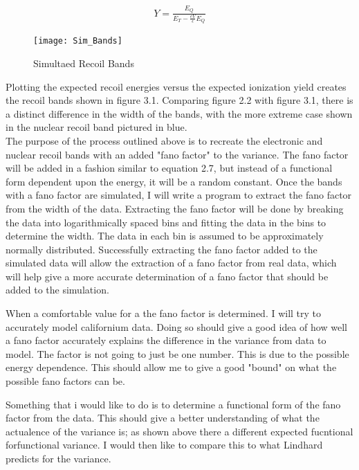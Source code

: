 \begin{equation}
\begin{gathered}
Y = \frac{E_Q}{E_T-\frac{eV}{\epsilon}E_Q}
\end{gathered}
\end{equation}



\begin{figure}[h]
	\centering
	\texttt{[image: Sim\_Bands]}
	\caption{Simultaed Recoil Bands}
\end{figure}
\noindent
Plotting the expected recoil energies versus the expected ionization yield creates the recoil bands shown in figure 3.1. Comparing figure 2.2 with figure 3.1, there is a distinct difference in the width of the bands, with the more extreme case shown in the nuclear recoil band pictured in blue. 
\\
The purpose of the process outlined above is to recreate the electronic and nuclear recoil bands with an added "fano factor" to the variance. The fano factor will be added in a fashion similar to equation 2.7, but instead of a functional form dependent upon the energy, it will be a random constant. Once the bands with a fano factor are simulated, I will write a program to extract the fano factor from the width of the data. Extracting the fano factor will be done by breaking the data into logarithmically spaced bins and fitting the data in the bins to determine the width. The data in each bin is assumed to be approximately normally distributed. Successfully extracting the fano factor added to the simulated data will allow the extraction of a fano factor from real data, which will help give a more accurate determination of a fano factor that should be added to the simulation. \par
\noindent
When a comfortable value for a the fano factor is determined. I will try to accurately model californium data. Doing so should give a good idea of how well a fano factor accurately explains the difference in the variance from data to model. The factor is not going to just be one number. This is due to the possible energy dependence. This should allow me to give a good "bound" on what the possible fano factors can be. \par
\noindent
Something that i would like to do is to determine a functional form of the fano factor from the data. This should give a better understanding of what the actualence of the variance is; as shown above there a different expected fucntional forfunctional variance. I would then like to compare this to what Lindhard predicts for the variance. 






